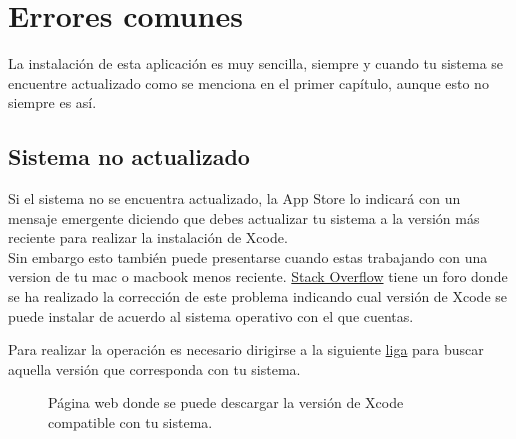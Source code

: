 \chapter{Errores comunes}

La instalación de esta aplicación es muy sencilla, siempre y cuando tu sistema se encuentre actualizado como se menciona en el primer capítulo, aunque esto no siempre es así.

\section{Sistema no actualizado}

Si el sistema no se encuentra actualizado, la App Store lo indicará con un mensaje emergente diciendo que debes actualizar tu sistema a la versión más reciente para realizar la instalación de Xcode.\\

Sin embargo esto también puede presentarse cuando estas trabajando con una version de tu mac o macbook menos reciente. \href{https://stackoverflow.com/}{Stack Overflow} tiene un foro donde se ha realizado la corrección de este problema indicando cual versión de Xcode se puede instalar de acuerdo al sistema operativo con el que cuentas.

Para realizar la operación es necesario dirigirse a la siguiente \href{https://stackoverflow.com/questions/10335747/how-to-download-xcode-dmg-or-xip-file/10335943#10335943}{liga} para buscar aquella versión que corresponda con tu sistema.

\begin{figure}[hbtp!]
	\begin{center}	
		\label{fig:stack}
		\caption{Página web donde se puede descargar la versión de Xcode compatible con tu sistema.}
	\end{center}
\end{figure}